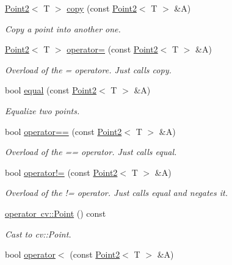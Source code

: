 \begin{DoxyCompactItemize}
\item 
\mbox{\hyperlink{class_point2}{Point2}}$<$ T $>$ \mbox{\hyperlink{class_point2_abf5cfefe8e75dda02f681fc8d74c2c39}{copy}} (const \mbox{\hyperlink{class_point2}{Point2}}$<$ T $>$ \&A)
\begin{DoxyCompactList}\small\item\em Copy a point into another one. \end{DoxyCompactList}\item 
\mbox{\hyperlink{class_point2}{Point2}}$<$ T $>$ \mbox{\hyperlink{class_point2_af715722f2b04def60eb23f291e31c4d8}{operator=}} (const \mbox{\hyperlink{class_point2}{Point2}}$<$ T $>$ \&A)
\begin{DoxyCompactList}\small\item\em Overload of the = operatore. Just calls {\ttfamily copy}. \end{DoxyCompactList}\item 
bool \mbox{\hyperlink{class_point2_a8ecda76875462077d1396319c8a582d5}{equal}} (const \mbox{\hyperlink{class_point2}{Point2}}$<$ T $>$ \&A)
\begin{DoxyCompactList}\small\item\em Equalize two points. \end{DoxyCompactList}\item 
bool \mbox{\hyperlink{class_point2_af58b2b05b59316580b3989b0548afade}{operator==}} (const \mbox{\hyperlink{class_point2}{Point2}}$<$ T $>$ \&A)
\begin{DoxyCompactList}\small\item\em Overload of the == operator. Just calls {\ttfamily equal}. \end{DoxyCompactList}\item 
bool \mbox{\hyperlink{class_point2_ad671e757853f5d7d5431d011d9e94b03}{operator!=}} (const \mbox{\hyperlink{class_point2}{Point2}}$<$ T $>$ \&A)
\begin{DoxyCompactList}\small\item\em Overload of the != operator. Just calls {\ttfamily equal} and negates it. \end{DoxyCompactList}\item 
\mbox{\hyperlink{class_point2_a0d3f17f7d86d02eae126aa329a20861a}{operator cv\+::\+Point}} () const
\begin{DoxyCompactList}\small\item\em Cast to cv\+::\+Point. \end{DoxyCompactList}\item 
bool \mbox{\hyperlink{class_point2_a636a84c47519a482cfce43039e981dff}{operator$<$}} (const \mbox{\hyperlink{class_point2}{Point2}}$<$ T $>$ \&A)
\end{DoxyCompactItemize}
